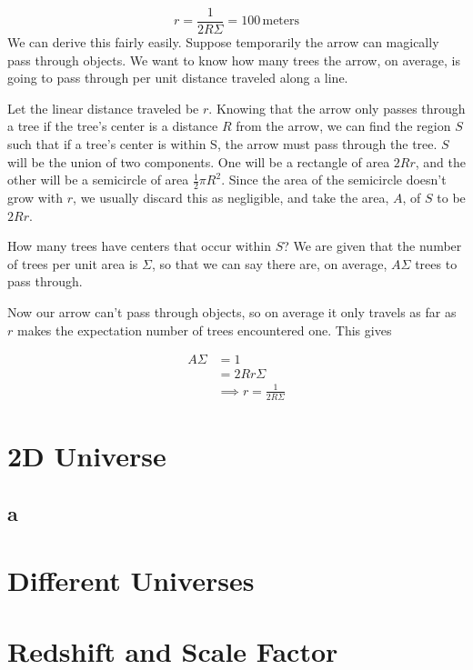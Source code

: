 \documentclass[12pt]{article}
\begin{document}
\[\boxed{r = \frac{1}{2R\Sigma}= 100 \,\mathrm{meters}}
\]
\newline
We can derive this fairly easily. Suppose temporarily the arrow can magically pass through objects. We want to know how many trees the arrow, on average, is going to pass through per unit distance traveled along a line.

Let the linear distance traveled be \(r\). Knowing that the arrow only passes through a tree if the tree's center is a distance \(R\) from the arrow, we can find the region \(S\) such that if a tree's center is within S, the arrow must pass through the tree. \(S\) will be the union of two components. One will be a rectangle of area \(2Rr\), and the other will be a semicircle of area \(\frac{1}{2}\pi R^2\). Since the area of the semicircle doesn't grow with \(r\), we usually discard this as negligible, and take the area, \(A\), of \(S\) to be \(2Rr\).

How many trees have centers that occur within \(S\)? We are given that the number of trees per unit area is \(\Sigma\), so that we can say there are, on average, \(A\Sigma\) trees to pass through.

Now our arrow can't pass through objects, so on average it only travels as far as \(r\) makes the expectation number of trees encountered one. This gives

\begin{align*}
A\Sigma &= 1 \\
&= 2Rr\Sigma \\
&\implies r = \frac{1}{2R\Sigma}
\end{align*}

\section{2D Universe}

\subsection*{a}

\section{Different Universes}

\section{Redshift and Scale Factor}
\end{document}
